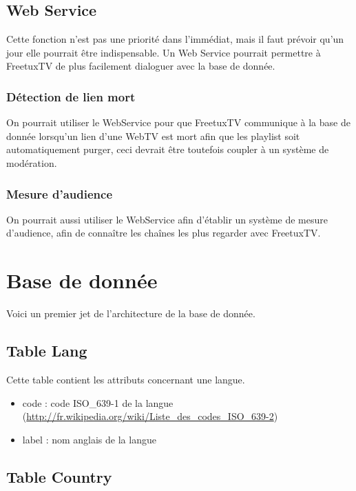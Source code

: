 \documentclass[10pt,a4paper]{article}
\begin{document}
\subsection{Web Service}

Cette fonction n'est pas une priorité dans l'immédiat, mais il faut prévoir qu'un jour elle pourrait être indispensable. Un Web Service pourrait permettre à FreetuxTV de plus facilement dialoguer avec la base de donnée. 

\subsubsection{Détection de lien mort}

On pourrait utiliser le WebService pour que FreetuxTV communique à la base de donnée lorsqu'un lien d'une WebTV est mort afin que les playlist soit automatiquement purger, ceci devrait être toutefois coupler à un système de modération.

\subsubsection{Mesure d'audience}

On pourrait aussi utiliser le WebService afin d'établir un système de mesure d'audience, afin de connaître les chaînes les plus regarder avec FreetuxTV.

\section{Base de donnée}

Voici un premier jet de l'architecture de la base de donnée.

\subsection{Table Lang}

Cette table contient les attributs concernant une langue.

\begin{itemize}
\item code : code ISO\_639-1 de la langue (\url{http://fr.wikipedia.org/wiki/Liste\_des\_codes\_ISO\_639-2})
\item label : nom anglais de la langue
\end{itemize}

\subsection{Table Country}
\end{document}
